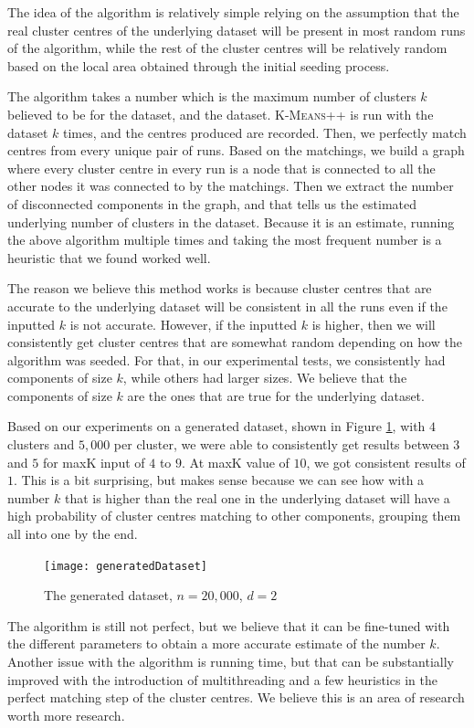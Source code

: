 \documentclass[12pt]{dalthesis}
\newcommand*{\kmeansn}{\textsc{K-Means}} %
\begin{document}
The idea of the algorithm is relatively simple relying on the assumption that the real cluster centres of the underlying dataset will be present in most random runs of the algorithm, while the rest of the cluster centres will be relatively random based on the local area obtained through the initial seeding process. 

The algorithm takes a number which is the maximum number of clusters $k$ believed to be for the dataset, and the dataset. \kmeansn++ is run with the dataset $k$ times, and the centres produced are recorded. Then, we perfectly match centres from every unique pair of runs. Based on the matchings, we build a graph where every cluster centre in every run is a node that is connected to all the other nodes it was connected to by the matchings. Then we extract the number of disconnected components in the graph, and that tells us the estimated underlying number of clusters in the dataset. Because it is an estimate, running the above algorithm multiple times and taking the most frequent number is a heuristic that we found worked well.

The reason we believe this method works is because cluster centres that are accurate to the underlying dataset will be consistent in all the runs even if the inputted $k$ is not accurate. However, if the inputted $k$ is higher, then we will consistently get cluster centres that are somewhat random depending on how the algorithm was seeded. For that, in our experimental tests, we consistently had components of size $k$, while others had larger sizes. We believe that the components of size $k$ are the ones that are true for the underlying dataset.

Based on our experiments on a generated dataset, shown in Figure \ref{fig:generatedDataset}, with $4$ clusters and $5,000$ per cluster, we were able to consistently get results between $3$ and $5$ for maxK input of $4$ to $9$. At maxK value of $10$, we got consistent results of $1$. This is a bit surprising, but makes sense because we can see how with a number $k$ that is higher than the real one in the underlying dataset will have a high probability of cluster centres matching to other components, grouping them all into one by the end.

\begin{figure}[h]
  \texttt{[image: generatedDataset]}
  \caption{The generated dataset, $n=20,000$, $d=2$} 
  \label{fig:generatedDataset}
\end{figure}

The algorithm is still not perfect, but we believe that it can be fine-tuned with the different parameters to obtain a more accurate estimate of the number $k$. Another issue with the algorithm is running time, but that can be substantially improved with the introduction of multithreading and a few heuristics in the perfect matching step of the cluster centres. We believe this is an area of research worth more research.
\end{document}
